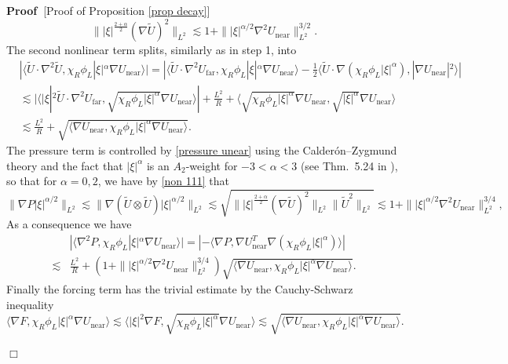 \documentclass[11pt,a4paper]{article}
\numberwithin{equation}{section}
\newcommand{\tmop}[1]{\ensuremath{\operatorname{#1}}}
\newenvironment{proof}{\noindent\textbf{Proof\ }}{\hspace*{\fill}$\Box$\medskip}
\begin{document}
\begin{proof}[Proof of Proposition \ref{prop decay}]
\begin{equation}
           \label{non 111}\||\xi|^{\frac{2+\alpha}{2}}(\nabla \widetilde{U})^2\|_{L^2}\lesssim1+\||\xi|^{\alpha/2}\nabla^2 U_{\tmop{near}}\|_{L^2}^{3/2}.
       \end{equation}
       The second nonlinear term splits, similarly as in step 1, into \[\begin{aligned}
&|\langle \widetilde{U} \cdot \nabla^2 \widetilde{U},\chi_R\phi_{L} |\xi|^\alpha\nabla U_{\tmop{near}}\rangle|=|\langle \widetilde{U} \cdot \nabla^2 U_{\tmop{far}},\chi_R\phi_{L} |\xi|^\alpha\nabla U_{\tmop{near}}\rangle-\frac12\langle \widetilde{U}  \cdot\nabla (\chi_R\phi_{L}|\xi|^\alpha), |\nabla U_{\tmop{near}}|^2\rangle|\\&\lesssim|\langle |\xi|^2\widetilde{U} \cdot \nabla^2 U_{\tmop{far}},\sqrt{\chi_R\phi_{L}|\xi|^\alpha}\nabla U_{\tmop{near}}\rangle|+\frac {L^2}{R}+\langle 
       \sqrt{\chi_R\phi_{L}|\xi|^\alpha}\nabla U_{\tmop{near}}, \sqrt{|\xi|^\alpha}\nabla U_{\tmop{near}}\rangle\\&\lesssim \frac {L^2}{R}+\sqrt{\langle 
       \nabla U_{\tmop{near}},\chi_R\phi_{L}|\xi|^\alpha \nabla U_{\tmop{near}}\rangle}.&\end{aligned}\]
       The pressure term is controlled by \eqref{pressure unear} using the Calderón–Zygmund theory and the fact that $|\xi|^\alpha$ is an $A_2$-weight for $-3<\alpha<3$ (see  Thm.~5.24 in \cite{grafakos2014}), so that for $\alpha=0,2$, we have by \eqref{non 111} that $$\|\nabla P|\xi|^{\alpha/2}\|_{L^2}\lesssim \|\nabla (\widetilde{U}\otimes\widetilde{U})|\xi|^{\alpha/2}\|_{L^2}\lesssim\sqrt{\||\xi|^{\frac{2+\alpha}{2}}(\nabla \widetilde{U})^2\|_{L^2}\| \widetilde{U}^2\|_{L^2}}\lesssim1+\||\xi|^{\alpha/2}\nabla^2 U_{\tmop{near}}\|_{L^2}^{3/4},$$ As a consequence we have \[\begin{aligned}
           &|\langle \nabla^2 P,\chi_R\phi_{L}|\xi|^\alpha\nabla U_{\tmop{near}}\rangle|=|-\langle \nabla  P, \nabla U_{\tmop{near}}^T\nabla (\chi_R\phi_{L}|\xi|^\alpha)\rangle|\\\lesssim & \frac {L^2}{R}+(1+\||\xi|^{\alpha/2}\nabla^2 U_{\tmop{near}}\|_{L^2}^{3/4})\sqrt{\langle 
       \nabla U_{\tmop{near}},\chi_R\phi_{L}|\xi|^\alpha\nabla U_{\tmop{near}}\rangle}.
       \end{aligned}\]
       Finally the forcing term has the trivial estimate by the Cauchy-Schwarz inequality\[\langle \nabla F,\chi_R\phi_{L}|\xi|^\alpha\nabla U_{\tmop{near}}\rangle\lesssim \langle |\xi|^2\nabla F, \sqrt{\chi_R\phi_{L}|\xi|^\alpha}\nabla U_{\tmop{near}}\rangle\lesssim\sqrt{\langle 
       \nabla U_{\tmop{near}},\chi_R\phi_{L}|\xi|^\alpha\nabla U_{\tmop{near}}\rangle}.\]


\end{proof}
\end{document}
